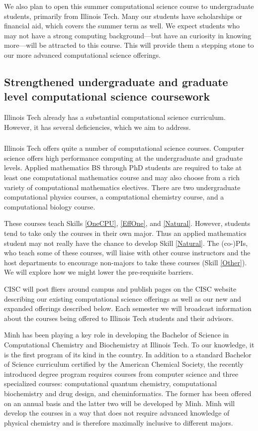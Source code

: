 \documentclass[11pt]{NSFamsart}
\begin{document}
We also plan to open this summer computational science course to undergraduate students, primarily from Illinois Tech.  Many our students have scholarships or financial aid, which covers the summer term as well.  We expect students who may not have a strong computing background---but have an curiosity in knowing more---will be attracted to this course.  This will provide them a stepping stone to our more advanced computational science offerings.


\subsection{Strengthened undergraduate and graduate level computational science coursework} \label{Curr} 
Illinois Tech already has a substantial computational science curriculum.  However, it has several deficiencies, which we aim to address.

\subsubsection{\CurrExistName} \label{CurrExist} Illinois Tech offers quite a number of computational science courses.  Computer science offers high performance computing at the undergraduate and graduate levels.  Applied mathematics BS through PhD students are required to take at least one computational mathematics course and may also choose from a rich variety of computational mathematics electives. There are two undergraduate computational physics courses, a computational chemistry course, and a computational biology course.

These courses teach Skills \ref{OneCPU}, \ref{EffOne}, and \ref{Natural}.  However, students tend to take only the courses in their own major.  Thus an applied mathematics student may not really have the chance to develop Skill \ref{Natural}.  The (co-)PIs, who teach some of these courses, will liaise  with other course instructors and the host departments to encourage non-majors to take these courses (Skill \ref{Other}).  We will explore how we might lower the pre-requisite barriers. 

CISC will post fliers around campus and publish pages on the CISC website describing our existing computational science offerings as well as our new and expanded offerings described below.  Each semester we will broadcast information about the courses being offered to Illinois Tech students and their advisors.

Minh has been playing a key role in developing the Bachelor of Science in Computational Chemistry and Biochemistry at Illinois Tech. To our knowledge, it is the first program of its kind in the country. In addition to a standard Bachelor of Science curriculum certified by the American Chemical Society, the recently introduced degree program requires courses from computer science and three specialized courses: computational quantum chemistry, computational biochemistry and drug design, and cheminformatics. The former has been offered on an annual basis and the latter two will be developed by Minh. Minh will develop the courses in a way that does not require advanced knowledge of physical chemistry and is therefore maximally inclusive to different majors.
\end{document}
